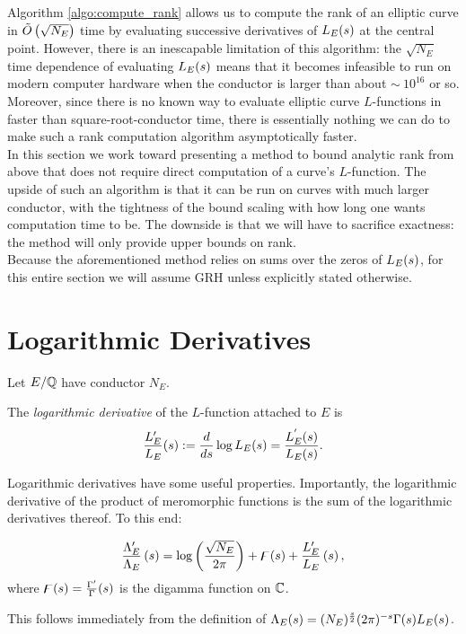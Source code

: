 
Algorithm \ref{algo:compute_rank} allows us to compute the rank of an elliptic curve in $\tilde{O}\left(\sqrt{N_E}\right)$ time by evaluating successive derivatives of $L_E(s)$ at the central point. However, there is an inescapable limitation of this algorithm: the $\sqrt{N_E}$ time dependence of evaluating $L_E(s)$ means that it becomes infeasible to run on modern computer hardware when the conductor is larger than about $\sim~10^{16}$ or so. Moreover, since there is no known way to evaluate elliptic curve $L$-functions in faster than square-root-conductor time, there is essentially nothing we can do to make such a rank computation algorithm asymptotically faster. \\

In this section we work toward presenting a method to bound analytic rank from above that does not require direct computation of a curve's $L$-function. The upside of such an algorithm is that it can be run on curves with much larger conductor, with the tightness of the bound scaling with how long one wants computation time to be. The downside is that we will have to sacrifice exactness: the method will only provide upper bounds on rank. \\

Because the aforementioned method relies on sums over the zeros of $L_E(s)$, for this entire section we will assume GRH unless explicitly stated otherwise.

\section{Logarithmic Derivatives}\label{sec:log_derivs}

Let $E/\mathbb{Q}$  have conductor $N_E$.
\begin{definition}
The {\it logarithmic derivative} of the $L$-function attached to $E$ is
\begin{equation}
\frac{L_E^{\prime}}{L_E}(s) := \frac{d}{ds} \log L_E(s) = \frac{L_E^{^{\prime}}(s)}{L_E(s)}.
\end{equation}
\end{definition}
Logarithmic derivatives have some useful properties. Importantly, the logarithmic derivative of the product of meromorphic functions is the sum of the logarithmic derivatives thereof. To this end:
\begin{proposition}
\begin{equation}\label{eqn:logderiv_relation}
\frac{\Lambda_E^{\prime}}{\Lambda_E}\left(s\right) = \log\left(\frac{\sqrt{N_E}}{2\pi}\right) + \digamma(s) + \frac{L_E^{\prime}}{L_E}\left(s\right),
\end{equation}
where $\digamma(s) = \frac{\Gamma^{\prime}}{\Gamma}(s)$ is the digamma function on $\mathbb{C}$.
\end{proposition}
This follows immediately from the definition of $\Lambda_E(s) = (N_E)^{\frac{s}{2}}(2\pi)^{-s}\Gamma(s)L_E(s)$. \\


